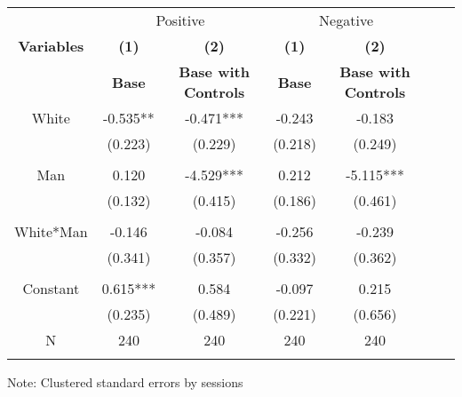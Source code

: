 \begin{table}[htbp]
    \begin{tabular}{c c c c c c c }
    \toprule
    &\multicolumn{2}{c}{Positive}         &\multicolumn{2}{c}{Negative}      \\

    \textbf{Variables} & \textbf{(1)} & \textbf{(2)}  & \textbf{(1)} & \textbf{(2)}              \\ 

    \textbf & \textbf{ Base } & \textbf{Base with Controls}  & \textbf{ Base } & \textbf{Base with Controls}  \\ 

    \midrule
    White              & -0.535**    & -0.471***   & -0.243     & -0.183  \\
                       & (0.223)     & (0.229)     & (0.218)    & (0.249)   \\
                       &             &             &            &                  \\
    Man                & 0.120       & -4.529***   & 0.212      & -5.115***  \\
                       & (0.132)     & (0.415)     & (0.186)    & (0.461)   \\
                       &             &             &            &                  \\
    White*Man          & -0.146      & -0.084      & -0.256     & -0.239  \\
                       & (0.341)     & (0.357)     & (0.332)    & (0.362)   \\
                       &             &             &            &                  \\

    Constant           &  0.615***   &  0.584      & -0.097     & 0.215             \\
                       &  (0.235)    &  (0.489)    & (0.221)    & (0.656)            \\
   

    \midrule
     N                  &   240          &      240  &     240  &     240        \\          
    \bottomrule
    \addlinespace[1ex]
    \multicolumn{3}{l}{\textsuperscript{***}$p<0.01$, 
      \textsuperscript{**}$p<0.05$, 
      \textsuperscript{*}$p<0.1$}
    \end{tabular}
    \newline
    Note: Clustered standard errors by sessions
\end{table}
